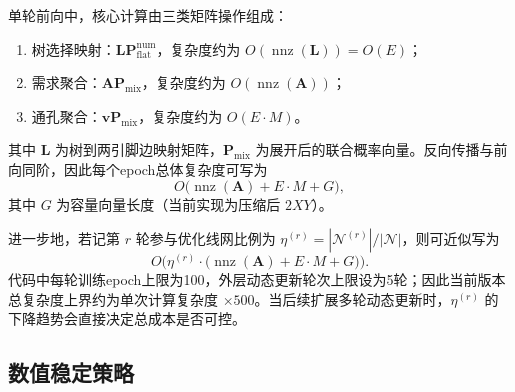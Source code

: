 单轮前向中，核心计算由三类矩阵操作组成：
\begin{enumerate}
    \item 树选择映射：$\mathbf{L}\mathbf{P}^{\mathrm{num}}_{\mathrm{flat}}$，复杂度约为 $O(\operatorname{nnz}(\mathbf{L}))=O(E)$；
    \item 需求聚合：$\mathbf{A}\mathbf{P}_{\mathrm{mix}}$，复杂度约为 $O(\operatorname{nnz}(\mathbf{A}))$；
    \item 通孔聚合：$\mathbf{v}\mathbf{P}_{\mathrm{mix}}$，复杂度约为 $O(E\cdot M)$。
\end{enumerate}
其中 $\mathbf{L}$ 为树到两引脚边映射矩阵，$\mathbf{P}_{\mathrm{mix}}$ 为展开后的联合概率向量。反向传播与前向同阶，因此每个epoch总体复杂度可写为
\begin{equation}
    O\big(\operatorname{nnz}(\mathbf{A}) + E\cdot M + G\big),
\end{equation}
其中 $G$ 为容量向量长度（当前实现为压缩后 $2XY$）。

进一步地，若记第 $r$ 轮参与优化线网比例为 $\eta^{(r)}=|\mathcal{N}^{(r)}|/|\mathcal{N}|$，则可近似写为
\begin{equation}
    O\Big(\eta^{(r)}\cdot\big(\operatorname{nnz}(\mathbf{A}) + E\cdot M + G\big)\Big).
\end{equation}
代码中每轮训练epoch上限为100，外层动态更新轮次上限设为5轮；因此当前版本总复杂度上界约为单次计算复杂度 $\times 500$。当后续扩展多轮动态更新时，$\eta^{(r)}$ 的下降趋势会直接决定总成本是否可控。

\subsection{数值稳定策略}

